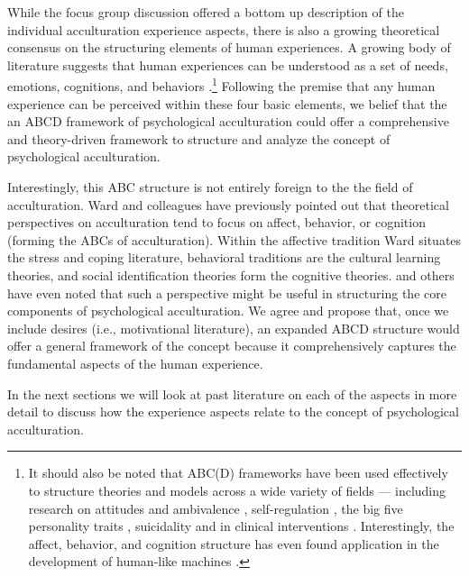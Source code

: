 \documentclass[man, 12pt, a4paper]{apa7}
\begin{document}
While the focus group discussion offered a bottom up description of the individual acculturation experience aspects, there is also a growing theoretical consensus on the structuring elements of human experiences. A growing body of literature suggests that human experiences can be understood as a set of needs, emotions, cognitions, and behaviors \citep[sometimes referred to as the ABCs or ABCDs of psychology: affect, behavior, cognition, desire; e.g.,][]{Cottam2010, Hogg2005, Jhangiani2014}.\footnote{It should also be noted that ABC(D) frameworks have been used effectively to structure theories and models across a wide variety of fields --- including research on attitudes \citep{Breckler1984} and ambivalence \citep{VanHarreveld2015}, self-regulation \citep{Ben-Eliyahu2015}, the big five personality traits \citep{Wilt2016}, suicidality \citep{Harris2015} and in clinical interventions \citep{Eifert1989}. Interestingly, the affect, behavior, and cognition structure has even found application in the development of human-like machines \citep{Guo2020}.} Following the premise that any human experience can be perceived within these four basic elements, we belief that the an ABCD framework of psychological acculturation could offer a comprehensive and theory-driven framework to structure and analyze the concept of psychological acculturation.

Interestingly, this ABC structure is not entirely foreign to the the field of acculturation. Ward and colleagues \citep{Ward2001, Masgoret2006, Ward2019} have previously pointed out that theoretical perspectives on acculturation tend to focus on affect, behavior, or cognition (forming the ABCs of acculturation). Within the affective tradition Ward situates the stress and coping literature, behavioral traditions are the cultural learning theories, and social identification theories form the cognitive theories. \citet{Sam2006b} and others have even noted that such a perspective might be useful in structuring the core components of psychological acculturation. We agree and propose that, once we include desires (i.e., motivational literature), an expanded ABCD structure would offer a general framework of the concept because it comprehensively captures the fundamental aspects of the human experience.

In the next sections we will look at past literature on each of the aspects in more detail to discuss how the experience aspects relate to the concept of psychological acculturation. 
\end{document}
